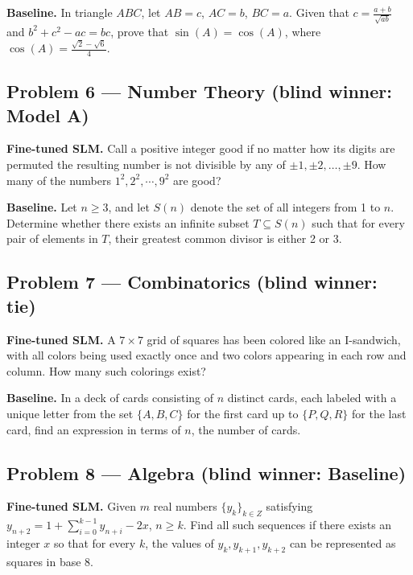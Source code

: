 \documentclass[11pt]{article}
\begin{document}
\textbf{Baseline.} In triangle $ABC$, let $AB=c$, $AC=b$, $BC=a$. Given that $c = \frac{a+b}{\sqrt{ab}}$ and $b^2 + c^2 - ac = bc$, prove that $\sin(A) = \cos(A)$, where $\cos(A) = \frac{\sqrt{2}-\sqrt{6}}{4}$.

\subsection*{Problem 6 --- Number Theory \quad (blind winner: Model A)}

\textbf{Fine-tuned SLM.} Call a positive integer good if no matter how its digits are permuted the resulting number is not divisible by any of $\pm1,\pm2,\ldots,\pm9$. How many of the numbers $1^{2}, 2^{2}, \cdots, 9^{2}$ are good?

\medskip

\textbf{Baseline.} Let $n \geq 3$, and let $S(n)$ denote the set of all integers from 1 to $n$. Determine whether there exists an infinite subset $T \subseteq S(n)$ such that for every pair of elements in $T$, their greatest common divisor is either 2 or 3.

\subsection*{Problem 7 --- Combinatorics \quad (blind winner: tie)}

\textbf{Fine-tuned SLM.} A $7\times7$ grid of squares has been colored like an I-sandwich, with all colors being used exactly once and two colors appearing in each row and column. How many such colorings exist?

\medskip

\textbf{Baseline.} In a deck of cards consisting of $n$ distinct cards, each labeled with a unique letter from the set $\{A, B, C\}$ for the first card up to $\{P, Q, R\}$ for the last card, find an expression in terms of $n$, the number of cards.

\subsection*{Problem 8 --- Algebra \quad (blind winner: Baseline)}

\textbf{Fine-tuned SLM.} Given $m$ real numbers $\{y_{k}\}_{k \in Z}$ satisfying $y_{n+2}=1+\sum_{i=0}^{k-1} y_{n+i}-2 x$, $n \geq k$. Find all such sequences if there exists an integer $x$ so that for every $k$, the values of $y_{k}, y_{k+1}, y_{k+2}$ can be represented as squares in base $8$.
\end{document}
